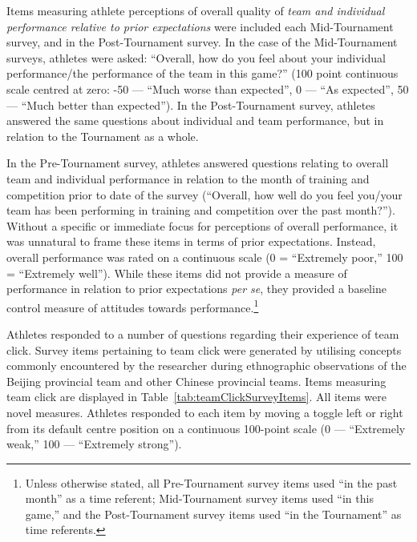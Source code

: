 \begin{CJK}{UTF8}{gbsn}
Items measuring athlete perceptions of overall quality of \textit{team and individual performance relative to prior expectations} were included each Mid-Tournament survey, and in the Post-Tournament survey.  In the case of the Mid-Tournament surveys, athletes were asked: ``Overall, how do you feel about your individual performance/the performance of the team in this game?'' (100 point continuous scale centred at zero: -50 --- ``Much worse than expected'', 0 --- ``As expected'', 50 ---  ``Much better than expected''). In the Post-Tournament survey, athletes answered the same questions about individual and team performance, but in relation to the Tournament as a whole.

In the Pre-Tournament survey, athletes answered questions relating to overall team and individual performance in relation to the month of training and competition prior to date of the survey (``Overall, how well do you feel you/your team has been performing in training and competition over the past month?'').
Without a specific or immediate focus for perceptions of overall performance, it was unnatural to frame these items in terms of prior expectations.  Instead, overall performance was rated on a continuous scale (0 = ``Extremely poor,'' 100 = ``Extremely well'').  While these items did not provide a measure of performance in relation to prior expectations \textit{per se}, they provided a baseline control measure of attitudes towards performance.\footnote{Unless otherwise stated, all Pre-Tournament survey items used ``in the past month'' as a time referent; Mid-Tournament survey items used ``in this game,'' and the Post-Tournament survey items used ``in the Tournament'' as time referents.}




Athletes responded to a number of questions regarding their experience of team click. Survey items pertaining to team click were generated by utilising concepts commonly encountered by the researcher during ethnographic observations of the Beijing provincial team and other Chinese provincial teams. Items measuring team click are displayed in Table~\ref{tab:teamClickSurveyItems}.  All items were novel measures. Athletes responded to each item by moving a toggle left or right from its default centre position on a continuous 100-point scale (0 --- ``Extremely weak,'' 100 --- ``Extremely strong'').


\end{CJK}
